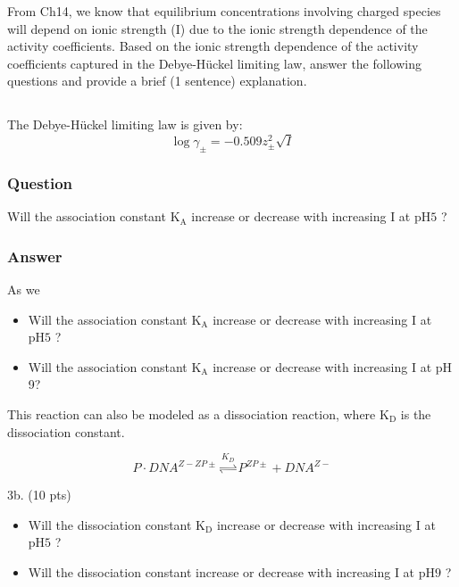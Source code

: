 \documentclass[12pt]{article}
\begin{document}
From Ch14, we know that equilibrium concentrations involving charged species will depend on ionic strength (I) due to the ionic strength dependence of the activity coefficients. Based on the ionic strength dependence of the activity coefficients captured in the Debye-Hückel limiting law, answer the following questions and provide a brief (1 sentence) explanation.

\subsection{}
The Debye-Hückel limiting law is given by:
\begin{equation}
\log \gamma_{\pm}=-0.509 z_{\pm}^{2} \sqrt{I}
\end{equation}
\subsubsection{Question}
Will the association constant $\mathrm{K}_{\mathrm{A}}$ increase or decrease with increasing I at $\mathrm{pH} 5$ ?
\subsubsection{Answer}
As we 


\begin{itemize}
  \item Will the association constant $\mathrm{K}_{\mathrm{A}}$ increase or decrease with increasing I at $\mathrm{pH} 5$ ?
  \item Will the association constant $\mathrm{K}_{\mathrm{A}}$ increase or decrease with increasing I at $\mathrm{pH}$ 9?
\end{itemize}

This reaction can also be modeled as a dissociation reaction, where $\mathrm{K}_{\mathrm{D}}$ is the dissociation constant.

$$
P \cdot D N A^{Z-Z P \pm} \stackrel{K_{D}}{\rightleftharpoons} P^{Z P \pm}+D N A^{Z-}
$$

3b. (10 pts)

\begin{itemize}
  \item Will the dissociation constant $\mathrm{K}_{\mathrm{D}}$ increase or decrease with increasing I at $\mathrm{pH} 5$ ?
  \item Will the dissociation constant increase or decrease with increasing I at $\mathrm{pH} 9$ ?
\end{itemize}
\end{document}
